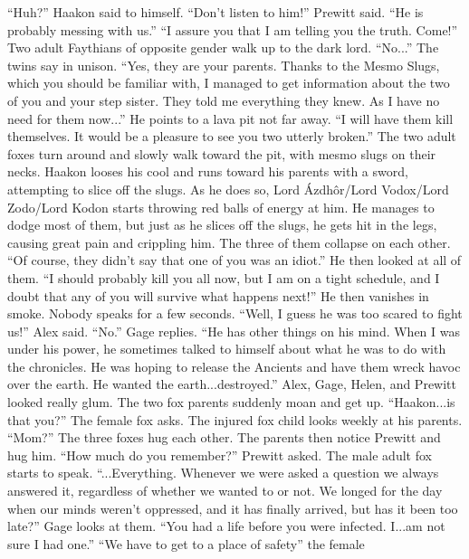 \documentclass{gd-document}
\begin{document}
\begin{enumerate}
\begin{enumerate}
      “Huh?” Haakon said to himself. “Don't listen to him!” Prewitt
      said. “He is probably messing with us.” “I assure you that I am
      telling you the truth. Come!” Two adult Faythians of opposite
      gender walk up to the dark lord. “No...” The twins say in
      unison. “Yes, they are your parents. Thanks to the Mesmo Slugs,
      which you should be familiar with, I managed to get information
      about the two of you and your step sister. They told me
      everything they knew. As I have no need for them now...” He
      points to a lava pit not far away. “I will have them kill
      themselves. It would be a pleasure to see you two utterly
      broken.” The two adult foxes turn around and slowly walk toward
      the pit, with mesmo slugs on their necks. Haakon looses his cool
      and runs toward his parents with a sword, attempting to slice
      off the slugs. As he does so, Lord Ázdhôr/Lord Vodox/Lord
      Zodo/Lord Kodon starts throwing red balls of energy at him. He
      manages to dodge most of them, but just as he slices off the
      slugs, he gets hit in the legs, causing great pain and crippling
      him. The three of them collapse on each other. “Of course, they
      didn't say that one of you was an idiot.” He then looked at all
      of them. “I should probably kill you all now, but I am on a
      tight schedule, and I doubt that any of you will survive what
      happens next!” He then vanishes in smoke. Nobody speaks for a
      few seconds. “Well, I guess he was too scared to fight us!” Alex
      said. “No.” Gage replies. “He has other things on his mind. When
      I was under his power, he sometimes talked to himself about what
      he was to do with the chronicles. He was hoping to release the
      Ancients and have them wreck havoc over the earth. He wanted the
      earth...destroyed.” Alex, Gage, Helen, and Prewitt looked really
      glum. The two fox parents suddenly moan and get up. “Haakon...is
      that you?” The female fox asks. The injured fox child looks
      weekly at his parents. “Mom?” The three foxes hug each
      other. The parents then notice Prewitt and hug him. “How much do
      you remember?” Prewitt asked. The male adult fox starts to
      speak. “...Everything. Whenever we were asked a question we
      always answered it, regardless of whether we wanted to or
      not. We longed for the day when our minds weren't oppressed, and
      it has finally arrived, but has it been too late?” Gage looks at
      them. “You had a life before you were infected. I...am not sure
      I had one.” “We have to get to a place of safety” the female

\end{enumerate}
\end{enumerate}
\end{document}
